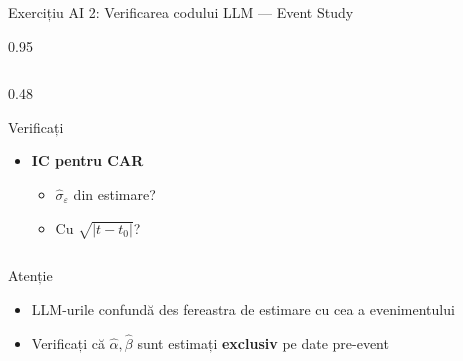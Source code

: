 \documentclass[9pt, aspectratio=169, t]{beamer}
\begin{document}
\begin{frame}[shrink=15]{Exercițiu AI 2: Verificarea codului LLM --- Event Study}
\begin{cminipage}{0.95\textwidth}
\begin{columns}[T]
\begin{column}{0.48\textwidth}
\begin{block}{\footnotesize Verificați}
\begin{itemize}
\begin{itemize}
    \end{itemize}
    \item \textbf{IC pentru CAR}
    \begin{itemize}\setlength{\itemsep}{0pt}
        \item $\hat\sigma_\varepsilon$ din estimare?
        \item Cu $\sqrt{|t-t_0|}$?
    \end{itemize}
\end{itemize}
\end{block}
\end{column}
\end{columns}
\vspace{0.1cm}
\begin{alertblock}{Atenție}
\footnotesize
\begin{itemize}\setlength{\itemsep}{0pt}
    \item LLM-urile confundă des fereastra de estimare cu cea a evenimentului
    \item Verificați că $\hat\alpha, \hat\beta$ sunt estimați \textbf{exclusiv} pe date pre-event
\end{itemize}
\end{alertblock}
\end{cminipage}
\end{frame}
\end{document}
